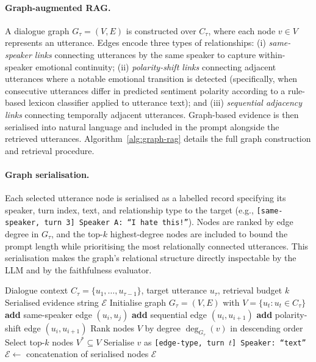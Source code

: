 \documentclass[runningheads]{llncs}
\begin{document}
\paragraph{Graph-augmented RAG.}
A dialogue graph $G_\tau = (V, E)$ is constructed over $C_\tau$, where
each node $v \in V$ represents an utterance. Edges encode three types
of relationships: (i) \emph{same-speaker links} connecting utterances
by the same speaker to capture within-speaker emotional continuity;
(ii) \emph{polarity-shift links} connecting adjacent utterances where
a notable emotional transition is detected (specifically, when consecutive
utterances differ in predicted sentiment polarity according to a
rule-based lexicon classifier applied to utterance text); and (iii) \emph{sequential
adjacency links} connecting temporally adjacent utterances.
Graph-based evidence is then serialised into natural language and
included in the prompt alongside the retrieved utterances.
Algorithm~\ref{alg:graph-rag} details the full graph construction and retrieval procedure.

\paragraph{Graph serialisation.}
Each selected utterance node is serialised as a labelled record
specifying its speaker, turn index, text, and relationship type to
the target (e.g.,
\texttt{[same-speaker, turn~3] Speaker~A: ``I hate this!''}).
Nodes are ranked by edge degree in $G_\tau$, and the top-$k$
highest-degree nodes are included to bound the prompt length while
prioritising the most relationally connected utterances. This
serialisation makes the graph's relational structure directly
inspectable by the LLM and by the faithfulness evaluator.

\begin{algorithm}[t]
\caption{Graph-Augmented Evidence Retrieval}
\label{alg:graph-rag}
\begin{algorithmic}[1]
\Require Dialogue context $C_\tau = \{u_1,\ldots,u_{\tau-1}\}$, target utterance $u_\tau$, retrieval budget $k$
\Ensure Serialised evidence string $\mathcal{E}$
\State Initialise graph $G_\tau = (V, E)$ with $V = \{u_t : u_t \in C_\tau\}$
     \textbf{add} same-speaker edge $(u_i, u_j)$ \EndIf
\EndFor
{}
    \State \textbf{add} sequential edge $(u_i, u_{i+1})$
     \textbf{add} polarity-shift edge $(u_i, u_{i+1})$ \EndIf
\EndFor
\State Rank nodes $V$ by degree $\deg_{G_\tau}(v)$ in descending order
\State Select top-$k$ nodes $V^* \subseteq V$
    \State Serialise $v$ as \texttt{[edge-type, turn $t$] Speaker: ``text''}
\EndFor
\State $\mathcal{E} \leftarrow$ concatenation of serialised nodes
\State \Return $\mathcal{E}$
\end{algorithmic}
\end{algorithm}
\end{document}
